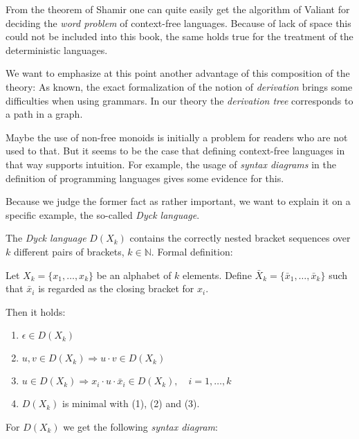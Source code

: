 From the theorem of Shamir one can quite easily get the algorithm of Valiant
for deciding the {\em word problem} of context-free languages. Because of lack
of space this could not be included into this book, the same holds true for the
treatment of the deterministic languages.

We want to emphasize at this point another advantage of this composition of the
theory: As known, the exact formalization of the notion of {\em derivation} 
brings some difficulties when using grammars. In our theory the {\em derivation
tree} corresponds to a path in a graph.

Maybe the use of non-free monoids is initially a problem for readers who are not
used to that. But it seems to be the case that defining context-free
languages in that way supports intuition. For example, the usage of
{\em syntax diagrams} in the definition of programming languages gives some
evidence for this.

Because we judge the former fact as rather important, we want to explain it on a
specific example, the so-called {\em Dyck language}.


The {\em Dyck language} $D(X_k)$ contains the correctly nested bracket sequences
over $k$ different pairs of brackets, $k \in \mathbb{N}$. Formal definition:

Let $X_k = \{ x_1, \ldots, x_k \}$ be an alphabet of $k$ elements. Define
$\bar{X}_k = \{ \bar{x}_1, \ldots, \bar{x}_k \}$ such that $\bar{x}_i$ is regarded 
as the closing bracket for $x_i$.

Then it holds:
\begin{enumerate}
  \item $\epsilon \in D(X_k)$
  \item $u, v \in D(X_k) \Rightarrow u \cdot v \in D(X_k)$
  \item $u \in D(X_k) \Rightarrow x_i \cdot u \cdot \bar{x}_i \in D(X_k),\quad i
  = 1, \ldots, k$
  \item $D(X_k)$ is minimal with (1), (2) and (3). 
\end{enumerate}

For $D(X_k)$ we get the following {\em syntax diagram}:

\begin{center}

\end{center}


